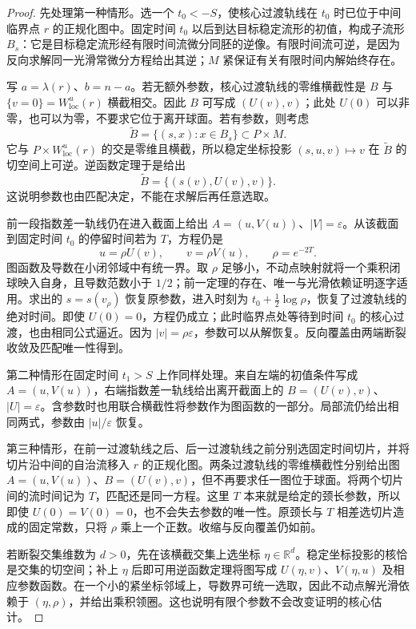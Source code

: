 \begin{proof}
	先处理第一种情形。选一个 \(t_0<-S\)，使核心过渡轨线在 \(t_0\) 时已位于中间临界点 \(r\) 的正规化图中。固定时间 \(t_0\) 以后到达目标稳定流形的初值，构成子流形 \(B_s\)：它是目标稳定流形经有限时间流微分同胚的逆像。有限时间流可逆，是因为反向求解同一光滑常微分方程给出其逆；\(M\) 紧保证有关有限时间内解始终存在。

	写 \(a=\lambda(r)\)、\(b=n-a\)。若无额外参数，核心过渡轨线的零维横截性是 \(B\) 与 \(\{v=0\}=W^u_{\mathrm{loc}}(r)\) 横截相交。因此 \(B\) 可写成 \((U(v),v)\)；此处 \(U(0)\) 可以非零，也可以为零，不要求它位于离开球面。若有参数，则考虑
	\[
		\widetilde B=\{(s,x):x\in B_s\}\subset P\times M.
	\]
	它与 \(P\times W^u_{\mathrm{loc}}(r)\) 的交是零维且横截，所以稳定坐标投影 \((s,u,v)\mapsto v\) 在 \(\widetilde B\) 的切空间上可逆。逆函数定理于是给出
	\[
		\widetilde B=\{(s(v),U(v),v)\}.
	\]
	这说明参数也由匹配决定，不能在求解后再任意选取。

	前一段指数差一轨线仍在进入截面上给出 \(A=(u,V(u))\)、\(|V|=\varepsilon\)。从该截面到固定时间 \(t_0\) 的停留时间若为 \(T\)，方程仍是
	\[
		u=\rho U(v),\qquad v=\rho V(u),\qquad \rho=e^{-2T}.
	\]
	图函数及导数在小闭邻域中有统一界。取 \(\rho\) 足够小，不动点映射就将一个乘积闭球映入自身，且导数范数小于 \(1/2\)；前一定理的存在、唯一与光滑依赖证明逐字适用。求出的 \(s=s(v_\rho)\) 恢复原参数，进入时刻为 \(t_0+\frac12\log\rho\)，恢复了过渡轨线的绝对时间。即使 \(U(0)=0\)，方程仍成立；此时临界点处等待到时间 \(t_0\) 的核心过渡，也由相同公式逼近。因为 \(|v|=\rho\varepsilon\)，参数可以从解恢复。反向覆盖由两端断裂收敛及匹配唯一性得到。

	第二种情形在固定时间 \(t_1>S\) 上作同样处理。来自左端的初值条件写成 \(A=(u,V(u))\)，右端指数差一轨线给出离开截面上的 \(B=(U(v),v)\)、\(|U|=\varepsilon\)。含参数时也用联合横截性将参数作为图函数的一部分。局部流仍给出相同两式，参数由 \(|u|/\varepsilon\) 恢复。

	第三种情形，在前一过渡轨线之后、后一过渡轨线之前分别选固定时间切片，并将切片沿中间的自治流移入 \(r\) 的正规化图。两条过渡轨线的零维横截性分别给出图 \(A=(u,V(u))\)、\(B=(U(v),v)\)，但不再要求任一图位于球面。将两个切片间的流时间记为 \(T\)，匹配还是同一方程。这里 \(T\) 本来就是给定的颈长参数，所以即使 \(U(0)=V(0)=0\)，也不会失去参数的唯一性。原颈长与 \(T\) 相差选切片造成的固定常数，只将 \(\rho\) 乘上一个正数。收缩与反向覆盖仍如前。

	若断裂交集维数为 \(d>0\)，先在该横截交集上选坐标 \(\eta\in\mathbb R^d\)。稳定坐标投影的核恰是交集的切空间；补上 \(\eta\) 后即可用逆函数定理将图写成 \(U(\eta,v)\)、\(V(\eta,u)\) 及相应参数函数。在一个小的紧坐标邻域上，导数界可统一选取，因此不动点解光滑依赖于 \((\eta,\rho)\)，并给出乘积领圈。这也说明有限个参数不会改变证明的核心估计。
\end{proof}

